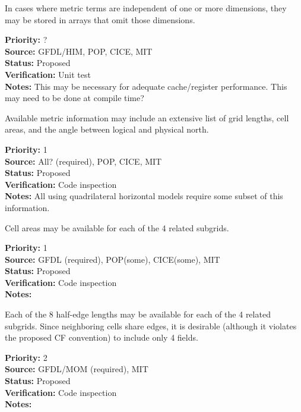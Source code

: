 In cases where metric terms are independent of one or more dimensions, they may be
stored in arrays that omit those dimensions.
\begin{reqlist}
{\bf Priority:} ? \\
{\bf Source:} GFDL/HIM, POP, CICE, MIT \\
{\bf Status:} Proposed \\
{\bf Verification:} Unit test \\
{\bf Notes:} This may be necessary for adequate cache/register performance.  This may
need to be done at compile time?
\end{reqlist}

Available metric information may include an extensive list of grid lengths, cell
areas, and the angle between logical and physical north.
\begin{reqlist}
{\bf Priority:} 1 \\
{\bf Source:} All? (required), POP, CICE, MIT \\
{\bf Status:} Proposed \\
{\bf Verification:} Code inspection \\
{\bf Notes:} All using quadrilateral horizontal models require some subset of this information.
\end{reqlist}

Cell areas may be available for each of the 4 related subgrids.
\begin{reqlist}
{\bf Priority:} 1 \\
{\bf Source:} GFDL (required), POP(some), CICE(some), MIT \\
{\bf Status:} Proposed \\
{\bf Verification:} Code inspection \\
{\bf Notes:} 
\end{reqlist}

Each of the 8 half-edge lengths may be available for each of the 4 related
subgrids.  Since neighboring cells share edges, it is desirable (although it violates
the proposed CF convention) to include only 4 fields.
\begin{reqlist}
{\bf Priority:} 2 \\
{\bf Source:} GFDL/MOM (required), MIT \\
{\bf Status:} Proposed \\
{\bf Verification:} Code inspection \\
{\bf Notes:} 
\end{reqlist}

